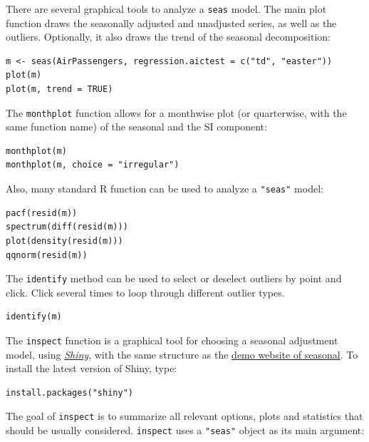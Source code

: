 There are several graphical tools to analyze a \texttt{seas} model. The
main plot function draws the seasonally adjusted and unadjusted series,
as well as the outliers. Optionally, it also draws the trend of the
seasonal decomposition:

\begin{verbatim}
m <- seas(AirPassengers, regression.aictest = c("td", "easter"))
plot(m)
plot(m, trend = TRUE)
\end{verbatim}

The \texttt{monthplot} function allows for a monthwise plot (or
quarterwise, with the same function name) of the seasonal and the SI
component:

\begin{verbatim}
monthplot(m)
monthplot(m, choice = "irregular")
\end{verbatim}

Also, many standard R function can be used to analyze a \texttt{"seas"}
model:

\begin{verbatim}
pacf(resid(m))
spectrum(diff(resid(m)))
plot(density(resid(m)))
qqnorm(resid(m))
\end{verbatim}

The \texttt{identify} method can be used to select or deselect outliers
by point and click. Click several times to loop through different
outlier types.

\begin{verbatim}
identify(m)
\end{verbatim}


The \texttt{inspect} function is a graphical tool for choosing a
seasonal adjustment model, using
\emph{\href{http://shiny.rstudio.com}{Shiny}}, with the same structure
as the \href{http://www.seasonal.website}{demo website of seasonal}. To
install the latest version of Shiny, type:

\begin{verbatim}
install.packages("shiny")
\end{verbatim}

The goal of \texttt{inspect} is to summarize all relevant options, plots
and statistics that should be usually considered. \texttt{inspect} uses
a \texttt{"seas"} object as its main argument:


